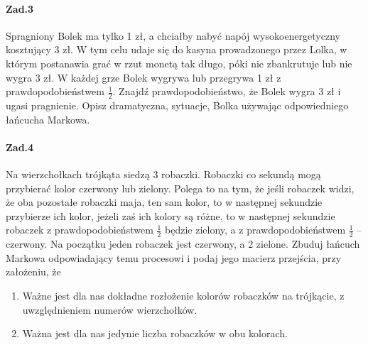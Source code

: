 \documentclass[a4paper,12pt]{article}
\theoremstyle{definition}%
\theoremstyle{definition}
\theoremstyle{problem}
\begin{document}
\paragraph{Zad.3} Spragniony Bolek ma tylko 1 zł, a chciałby nabyć napój wysokoenergetyczny kosztujący 3 zł. W tym celu udaje się do kasyna prowadzonego przez Lolka, w którym postanawia grać w rzut monetą tak długo, póki nie zbankrutuje lub nie wygra 3 zł. W każdej grze Bolek wygrywa lub przegrywa 1 zł z prawdopodobieństwem $\frac{1}{2}$. Znajdź prawdopodobieństwo, że Bolek wygra 3 zł i ugasi pragnienie. Opisz dramatyczna, sytuacje, Bolka używając odpowiedniego łańcucha Markowa.

\paragraph{Zad.4} Na wierzchołkach trójkąta siedzą 3 robaczki. Robaczki co sekundą mogą przybierać kolor czerwony lub zielony. Polega to na tym, że jeśli robaczek widzi, że oba pozostałe robaczki maja, ten sam kolor, to w następnej sekundzie przybierze ich kolor, jeżeli zaś ich kolory są różne, to w następnej sekundzie robaczek z prawdopodobieństwem $\frac{1}{2}$ będzie zielony, a z prawdopodobieństwem $\frac{1}{2}$ – czerwony. Na początku jeden robaczek jest czerwony, a 2 zielone. Zbuduj łańcuch Markowa odpowiadający temu procesowi i podaj jego macierz przejścia, przy założeniu, że
\begin{enumerate}[label=\alph*)]
\item Ważne jest dla nas dokładne rozłożenie kolorów robaczków na trójkącie, z uwzględnieniem numerów wierzchołków.
\item Ważna jest dla nas jedynie liczba robaczków w obu kolorach.
\end{enumerate}
\end{document}
